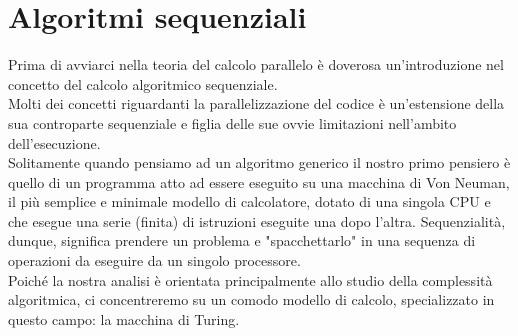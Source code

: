 \chapter{Algoritmi sequenziali}
Prima di avviarci nella teoria del calcolo parallelo è doverosa un'introduzione nel concetto del calcolo algoritmico sequenziale.\\
Molti dei concetti riguardanti la parallelizzazione del codice è un'estensione della sua controparte sequenziale e figlia delle sue ovvie limitazioni nell'ambito dell'esecuzione.\cite{Placeholder}\\
Solitamente quando pensiamo ad un algoritmo generico il nostro primo pensiero è quello di un programma atto ad essere eseguito su una macchina di Von Neuman, il più semplice e minimale modello di calcolatore, dotato di una singola CPU e che esegue una serie (finita) di istruzioni eseguite una dopo l'altra. Sequenzialità, dunque, significa prendere un problema e "spacchettarlo" in una sequenza di operazioni da eseguire da un singolo processore.\\
Poiché la nostra analisi è orientata principalmente allo studio della complessità algoritmica, ci concentreremo su un comodo modello di calcolo, specializzato in questo campo: la macchina di Turing.
